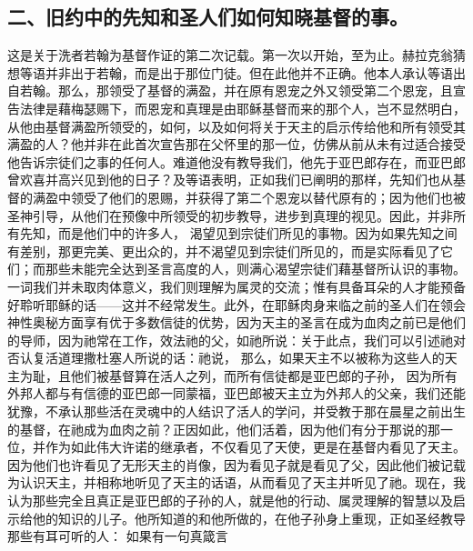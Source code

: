 
\subsection{二、旧约中的先知和圣人们如何知晓基督的事。}

  这是关于洗者若翰为基督作证的第二次记载。第一次以开始，至为止。赫拉克翁猜想等语并非出于若翰，而是出于那位门徒。但在此他并不正确。他本人承认等语出自若翰。那么，那领受了基督的满盈，并在原有恩宠之外又领受第二个恩宠，且宣告法律是藉梅瑟赐下，而恩宠和真理是由耶稣基督而来的那个人，岂不显然明白，从他由基督满盈所领受的，如何，以及如何将关于天主的启示传给他和所有领受其满盈的人？他并非在此首次宣告那在父怀里的那一位，仿佛从前从未有过适合接受他告诉宗徒们之事的任何人。难道他没有教导我们，他先于亚巴郎存在，而亚巴郎曾欢喜并高兴见到他的日子？及等语表明，正如我们已阐明的那样，先知们也从基督的满盈中领受了他们的恩赐，并获得了第二个恩宠以替代原有的；因为他们也被圣神引导，从他们在预像中所领受的初步教导，进步到真理的视见。因此，并非所有先知，而是他们中的许多人， 渴望见到宗徒们所见的事物。因为如果先知之间有差别，那更完美、更出众的，并不渴望见到宗徒们所见的，而是实际看见了它们；而那些未能完全达到圣言高度的人，则满心渴望宗徒们藉基督所认识的事物。一词我们并未取肉体意义，我们则理解为属灵的交流；惟有具备耳朵的人才能预备好聆听耶稣的话——这并不经常发生。此外，在耶稣肉身来临之前的圣人们在领会神性奥秘方面享有优于多数信徒的优势，因为天主的圣言在成为血肉之前已是他们的导师，因为祂常在工作，效法祂的父，如祂所说：关于此点，我们可以引述祂对否认复活道理撒杜塞人所说的话：祂说， 那么，如果天主不以被称为这些人的天主为耻，且他们被基督算在活人之列，而所有信徒都是亚巴郎的子孙， 因为所有外邦人都与有信德的亚巴郎一同蒙福，亚巴郎被天主立为外邦人的父亲，我们还能犹豫，不承认那些活在灵魂中的人结识了活人的学问，并受教于那在晨星之前出生的基督，在祂成为血肉之前？正因如此，他们活着，因为他们有分于那说的那一位，并作为如此伟大许诺的继承者，不仅看见了天使，更是在基督内看见了天主。因为他们也许看见了无形天主的肖像，因为看见子就是看见了父，因此他们被记载为认识天主，并相称地听见了天主的话语，从而看见了天主并听见了祂。现在，我认为那些完全且真正是亚巴郎的子孙的人，就是他的行动、属灵理解的智慧以及启示给他的知识的儿子。他所知道的和他所做的，在他子孙身上重现，正如圣经教导那些有耳可听的人： 如果有一句真箴言 